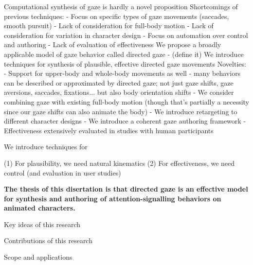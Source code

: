 Computational synthesis of gaze is hardly a novel proposition
Shortcomings of previous techniques:
- Focus on specific types of gaze movements (saccades, smooth pursuit)
- Lack of consideration for full-body motion
- Lack of consideration for variation in character design
- Focus on automation over control and authoring
- Lack of evaluation of effectiveness
We propose a broadly applicable model of gaze behavior called directed gaze - (define it)
We introduce techniques for synthesis of plausible, effective directed gaze movements
Novelties:
- Support for upper-body and whole-body movements as well - many behaviors can be described or approximated by directed gaze; not just gaze shifts, gaze aversions, saccades, fixations... but also body orientation shifts
- We consider combining gaze with existing full-body motion (though that's partially a necessity since our gaze shifts can also animate the body)
- We introduce retargeting to different character designs
- We introduce a coherent gaze authoring framework
- Effectiveness extensively evaluated in studies with human participants

We introduce techniques for 

(1) For plausibility, we need natural kinematics
(2) For effectiveness, we need control (and evaluation in user studies)


\textbf{The thesis of this disertation is that directed gaze is an effective model for synthesis and authoring of attention-signalling behaviors on animated characters.} 


Key ideas of this research

Contributions of this research

Scope and applications
